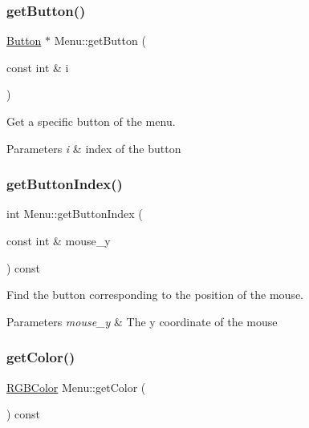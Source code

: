 \subsubsection{\texorpdfstring{get\+Button()}{getButton()}}
{\footnotesize\ttfamily \mbox{\hyperlink{class_button}{Button}} $\ast$ Menu\+::get\+Button (\begin{DoxyParamCaption}\item[{const int \&}]{i }\end{DoxyParamCaption})}



Get a specific button of the menu. 


\begin{DoxyParams}{Parameters}
{\em i} & index of the button \\
\hline
\end{DoxyParams}
\mbox{\label{class_menu_a83b3fc6786188f496f87658e099f2371}} 
\subsubsection{\texorpdfstring{get\+Button\+Index()}{getButtonIndex()}}
{\footnotesize\ttfamily int Menu\+::get\+Button\+Index (\begin{DoxyParamCaption}\item[{const int \&}]{mouse\+\_\+y }\end{DoxyParamCaption}) const}



Find the button corresponding to the position of the mouse. 


\begin{DoxyParams}{Parameters}
{\em mouse\+\_\+y} & The y coordinate of the mouse \\
\hline
\end{DoxyParams}
\mbox{\label{class_menu_af5046c732ceebbb3fc86b42f79d55873}} 
\subsubsection{\texorpdfstring{get\+Color()}{getColor()}}
{\footnotesize\ttfamily \mbox{\hyperlink{class_r_g_b_color}{R\+G\+B\+Color}} Menu\+::get\+Color (\begin{DoxyParamCaption}{ }\end{DoxyParamCaption}) const}



